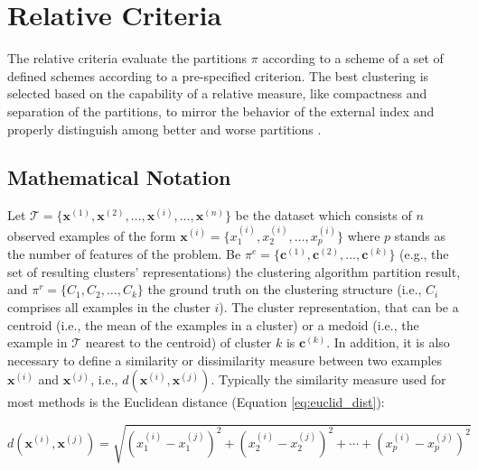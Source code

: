 \section{Relative Criteria}
\label{sec:relative_criterian}

The relative criteria evaluate the partitions $\pi$ according to a scheme of a set of defined schemes according to a pre-specified criterion. The best clustering is selected based on the capability of a relative measure, like compactness and separation of the partitions, to mirror the behavior of the external index and properly distinguish among better and worse partitions \cite{vendramin2010relative}.


\subsection{Mathematical Notation}

Let $\mathcal{T} = \{\mathbf{x}^{(1)}, \mathbf{x}^{(2)},\ldots, \mathbf{x}^{(i)}, \ldots, \mathbf{x}^{(n)}\}$ be the dataset which consists of $n$ observed examples of the form $\mathbf{x}^{(i)} = \{x^{(i)}_1 ,x^{(i)}_{2},\ldots,x^{(i)}_{p}\}$ where $p$ stands as the number of features of the problem. Be $\pi^e=\{\mathbf{c}^{(1)}, \mathbf{c}^{(2)}, \ldots, \mathbf{c}^{(k)}\}$ (e.g., the set of resulting clusters' representations) the clustering algorithm partition result, and $\pi^r=\{C_1, C_2, \ldots, C_k\}$ the ground truth on the clustering structure (i.e., $C_i$ comprises all examples in the cluster $i$). The cluster representation, that can be a centroid (i.e., the mean of the examples in a cluster) or a medoid (i.e., the example in $\mathcal{T}$ nearest to the centroid) of cluster $k$ is $\mathbf{c}^{(k)}$. In addition, it is also necessary to define a similarity or dissimilarity measure between two examples $\mathbf{x}^{(i)}$ and $\mathbf{x}^{(j)}$, i.e., $d(\mathbf{x}^{(i)},\mathbf{x}^{(j)})$. Typically the similarity measure used for most methods is the Euclidean distance (Equation \ref{eq:euclid_dist}): 


\begin{equation}
    d(\textbf{x}^{(i)},\textbf{x}^{(j)}) = \sqrt{(x^{(i)}_{1} - x^{(j)}_{1})^{2} + (x^{(i)}_{2} - x^{(j)}_{2})^{2} + \cdots + (x^{(i)}_p - x^{(j)}_{p})^{2}}
    \label{eq:euclid_dist}
\end{equation}

